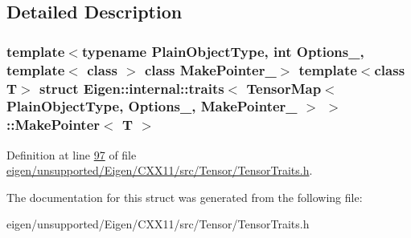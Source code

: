 \subsection{Detailed Description}
\subsubsection*{template$<$typename Plain\+Object\+Type, int Options\+\_\+, template$<$ class $>$ class Make\+Pointer\+\_\+$>$\newline
template$<$class T$>$\newline
struct Eigen\+::internal\+::traits$<$ Tensor\+Map$<$ Plain\+Object\+Type, Options\+\_\+, Make\+Pointer\+\_\+ $>$ $>$\+::\+Make\+Pointer$<$ T $>$}



Definition at line \hyperlink{eigen_2unsupported_2_eigen_2_c_x_x11_2src_2_tensor_2_tensor_traits_8h_source_l00097}{97} of file \hyperlink{eigen_2unsupported_2_eigen_2_c_x_x11_2src_2_tensor_2_tensor_traits_8h_source}{eigen/unsupported/\+Eigen/\+C\+X\+X11/src/\+Tensor/\+Tensor\+Traits.\+h}.



The documentation for this struct was generated from the following file\+:\begin{DoxyCompactItemize}
\item 
eigen/unsupported/\+Eigen/\+C\+X\+X11/src/\+Tensor/\+Tensor\+Traits.\+h\end{DoxyCompactItemize}
